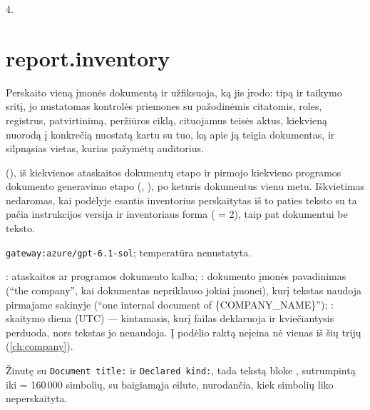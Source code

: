  4.


\section{report.inventory}\label{sec:aprompts:report-inventory}

 Perskaito vieną įmonės dokumentą ir užfiksuoja, ką jis įrodo: tipą
ir taikymo sritį, jo nustatomas kontrolės priemones su pažodinėmis citatomis, roles, registrus,
patvirtinimą, peržiūros ciklą, cituojamus teisės aktus, kiekvieną nuorodą į konkrečią nuostatą
kartu su tuo, ką apie ją teigia dokumentas, ir silpnąsias vietas, kurias pažymėtų auditorius.

  (), iš
kiekvienos ataskaitos dokumentų etapo ir pirmojo kiekvieno programos dokumento generavimo etapo
(, ), po keturis dokumentus vienu metu. Iškvietimas
nedaromas, kai podėlyje esantis inventorius perskaitytas iš to paties teksto su ta pačia
instrukcijos versija ir inventoriaus forma ( = 2), taip pat dokumentui be
teksto.

 \texttt{gateway:azure/gpt-6.1-sol}; temperatūra
nenustatyta.

 : ataskaitos ar programos dokumento kalba;
: dokumento įmonės pavadinimas (\enquote{the company}, kai dokumentas
nepriklauso jokiai įmonei), kurį tekstas naudoja pirmajame sakinyje (\enquote{one internal
document of \{COMPANY\_NAME\}}); : skaitymo diena (UTC) --- kintamasis, kurį
failas deklaruoja ir kviečiantysis perduoda, nors tekstas jo nenaudoja. Į podėlio raktą neįeina
nė vienas iš šių trijų (\cref{ch:company}).

 Žinutę su \texttt{Document title:} ir \texttt{Declared kind:},
tada tekstą bloke , sutrumpintą iki  = 160\,000
simbolių, su baigiamąja eilute, nurodančia, kiek simbolių liko neperskaityta.

